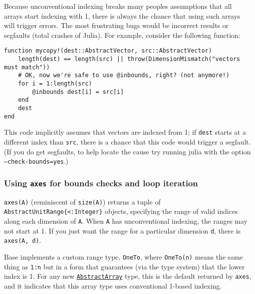 Because unconventional indexing breaks many people{\textquotesingle}s assumptions that all arrays start indexing with 1, there is always the chance that using such arrays will trigger errors. The most frustrating bugs would be incorrect results or segfaults (total crashes of Julia). For example, consider the following function:




\begin{verbatim}
function mycopy!(dest::AbstractVector, src::AbstractVector)
    length(dest) == length(src) || throw(DimensionMismatch("vectors must match"))
    # OK, now we're safe to use @inbounds, right? (not anymore!)
    for i = 1:length(src)
        @inbounds dest[i] = src[i]
    end
    dest
end
\end{verbatim}



This code implicitly assumes that vectors are indexed from 1; if \texttt{dest} starts at a different index than \texttt{src}, there is a chance that this code would trigger a segfault. (If you do get segfaults, to help locate the cause try running julia with the option \texttt{--check-bounds=yes}.)



\hypertarget{1628519832551402952}{}


\subsubsection{Using \texttt{axes} for bounds checks and loop iteration}



\texttt{axes(A)} (reminiscent of \texttt{size(A)}) returns a tuple of \texttt{AbstractUnitRange\{<:Integer\}} objects, specifying the range of valid indices along each dimension of \texttt{A}.  When \texttt{A} has unconventional indexing, the ranges may not start at 1.  If you just want the range for a particular dimension \texttt{d}, there is \texttt{axes(A, d)}.



Base implements a custom range type, \texttt{OneTo}, where \texttt{OneTo(n)} means the same thing as \texttt{1:n} but in a form that guarantees (via the type system) that the lower index is 1. For any new \hyperlink{6514416309183787338}{\texttt{AbstractArray}} type, this is the default returned by \texttt{axes}, and it indicates that this array type uses {\textquotedbl}conventional{\textquotedbl} 1-based indexing.



